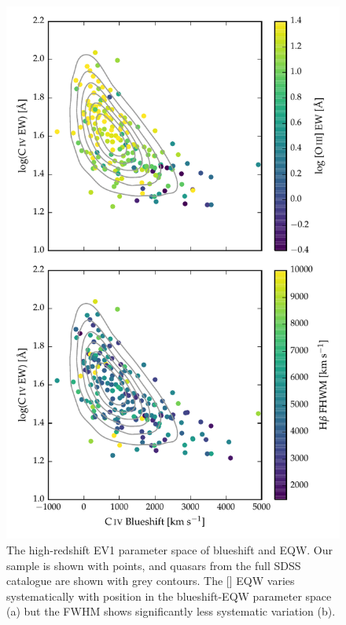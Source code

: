 \begin{figure}
    \includegraphics[width=\columnwidth]{figures/chapter04/ev1.pdf} 
    \caption[{The high-redshift \ac{EV1} parameter space of  blueshift and \ac{EQW}.}]{The high-redshift \ac{EV1} parameter space of  blueshift and \ac{EQW}. Our sample is shown with points, and quasars from the full \ac{SDSS} catalogue are shown with grey contours. The [] EQW varies systematically with position in the  blueshift-\ac{EQW} parameter space (a) but the \hb \ac{FWHM} shows significantly less systematic variation (b).}      
    \label{fig:ev1}
\end{figure}

